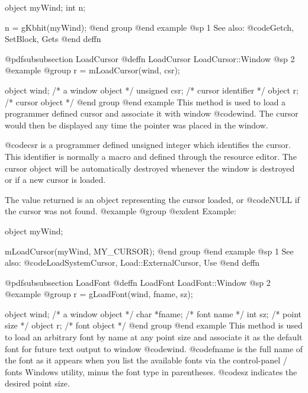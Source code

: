 object  myWind;
int     n;

n = gKbhit(myWind);
@end group
@end example
@sp 1
See also:  @code{Getch, SetBlock, Gets}
@end deffn



















@pdfsubsubsection {LoadCursor}
@deffn {LoadCursor} LoadCursor::Window
@sp 2
@example
@group
r = mLoadCursor(wind, csr);

object   wind;  /*  a window object    */
unsigned csr;   /*  cursor identifier  */
object   r;     /*  cursor object      */
@end group
@end example
This method is used to load a programmer defined cursor and associate it
with window @code{wind}.  The cursor would then be displayed any time
the pointer was placed in the window.

@code{csr} is a programmer defined unsigned integer which identifies
the cursor.  This identifier is normally a macro and defined through the
resource editor.  The cursor object will be automatically destroyed
whenever the window is destroyed or if a new cursor is loaded.

The value returned is an object representing the cursor loaded, or
@code{NULL} if the cursor was not found.
@example
@group
@exdent Example:

object  myWind;

mLoadCursor(myWind, MY_CURSOR);
@end group
@end example
@sp 1
See also:  @code{LoadSystemCursor, Load::ExternalCursor, Use}
@end deffn











@pdfsubsubsection {LoadFont}
@deffn {LoadFont} LoadFont::Window
@sp 2
@example
@group
r = gLoadFont(wind, fname, sz);

object   wind;  /*  a window object  */
char    *fname; /*  font name        */
int      sz;    /*  point size       */
object   r;     /*  font object      */
@end group
@end example
This method is used to load an arbitrary font by name at any point size
and associate it as the default font for future text output to window
@code{wind}.  @code{fname} is the full name of the font as it appears
when you list the available fonts via the control-panel / fonts Windows
utility, minus the font type in parentheses.  @code{sz} indicates the
desired point size.

